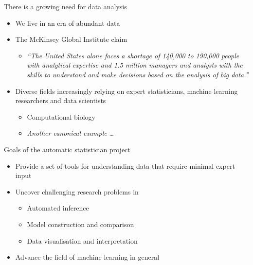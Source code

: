\begin{frame}{There is a growing need for data analysis}
  \begin{itemize}
    \item We live in an era of abundant data
    \vspace{\baselineskip}
    \item The McKinsey Global Institute claim
    \begin{itemize}
      \item \emph{``The United States alone faces a shortage of 140,000 to 190,000 people with analytical expertise and 1.5 million managers and analysts with the skills to understand and make decisions based on the analysis of big data.''}
    \end{itemize}
    \vspace{\baselineskip}
    \item Diverse fields increasingly relying on expert statisticians, machine learning researchers and data scientists
    \begin{itemize}
       \item \eg Computational biology
       \item \emph{Another canonical example} \ldots
     \end{itemize}
  \end{itemize}
\end{frame}

\begin{frame}{Goals of the automatic statistician project}
  \begin{itemize}
    \item Provide a set of tools for understanding data that require minimal expert input
    \vspace{\baselineskip}
    \item Uncover challenging research problems in \eg
    \begin{itemize}
      \item Automated inference
      \item Model construction and comparison
      \item Data visualisation and interpretation
    \end{itemize}
    \vspace{\baselineskip}
    \item Advance the field of machine learning in general
    \vspace{\baselineskip}
  \end{itemize}
\end{frame}

